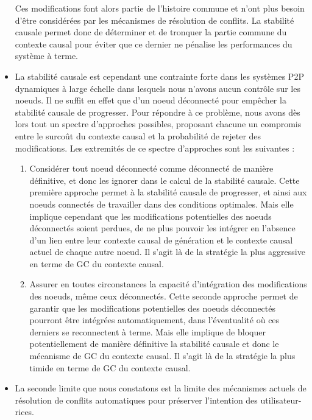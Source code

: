 \begin{itemize}
        Ces modifications font alors partie de l'histoire commune et n'ont plus besoin d'être considérées par les mécanismes de résolution de conflits.
        La stabilité causale permet donc de déterminer et de tronquer la partie commune du contexte causal pour éviter que ce dernier ne pénalise les performances du système à terme.
    \item La stabilité causale est cependant une contrainte forte dans les systèmes \ac{P2P} dynamiques à large échelle dans lesquels nous n'avons aucun contrôle sur les noeuds.
        Il ne suffit en effet que d'un noeud déconnecté pour empêcher la stabilité causale de progresser.
        Pour répondre à ce problème, nous avons dès lors tout un spectre d'approches possibles, proposant chacune un compromis entre le surcoût du contexte causal et la probabilité de rejeter des modifications.
        Les extremités de ce spectre d'approches sont les suivantes :
        \begin{enumerate}
            \item Considérer tout noeud déconnecté comme déconnecté de manière définitive, et donc les ignorer dans le calcul de la stabilité causale.
                Cette première approche permet à la stabilité causale de progresser, et ainsi aux noeuds connectés de travailler dans des conditions optimales.
                Mais elle implique cependant que les modifications potentielles des noeuds déconnectés soient perdues, \ie de ne plus pouvoir les intégrer en l'absence d'un lien entre leur contexte causal de génération et le contexte causal actuel de chaque autre noeud.
                Il s'agit là de la stratégie la plus aggressive en terme de \ac{GC} du contexte causal.
            \item Assurer en toutes circonstances la capacité d'intégration des modifications des noeuds, même ceux déconnectés.
                Cette seconde approche permet de garantir que les modifications potentielles des noeuds déconnectés pourront être intégrées automatiquement, dans l'éventualité où ces derniers se reconnectent à terme.
                Mais elle implique de bloquer potentiellement de manière définitive la stabilité causale et donc le mécanisme de \ac{GC} du contexte causal.
                Il s'agit là de la stratégie la plus timide en terme de \ac{GC} du contexte causal.
        \end{enumerate}
    \item La seconde limite que nous constatons est la limite des mécanismes actuels de résolution de conflits automatiques pour préserver l'intention des utilisateur-rices.

\end{itemize}
